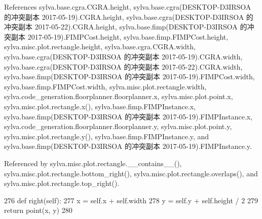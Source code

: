 References sylva.\+base.\+cgra.\+C\+G\+R\+A.\+height, sylva.\+base.\+cgra(\+D\+E\+S\+K\+T\+O\+P-\/\+D3\+I\+R\+S\+O\+A 的冲突副本 2017-\/05-\/19).\+C\+G\+R\+A.\+height, sylva.\+base.\+cgra(\+D\+E\+S\+K\+T\+O\+P-\/\+D3\+I\+R\+S\+O\+A 的冲突副本 2017-\/05-\/22).\+C\+G\+R\+A.\+height, sylva.\+base.\+fimp(\+D\+E\+S\+K\+T\+O\+P-\/\+D3\+I\+R\+S\+O\+A 的冲突副本 2017-\/05-\/19).\+F\+I\+M\+P\+Cost.\+height, sylva.\+base.\+fimp.\+F\+I\+M\+P\+Cost.\+height, sylva.\+misc.\+plot.\+rectangle.\+height, sylva.\+base.\+cgra.\+C\+G\+R\+A.\+width, sylva.\+base.\+cgra(\+D\+E\+S\+K\+T\+O\+P-\/\+D3\+I\+R\+S\+O\+A 的冲突副本 2017-\/05-\/19).\+C\+G\+R\+A.\+width, sylva.\+base.\+cgra(\+D\+E\+S\+K\+T\+O\+P-\/\+D3\+I\+R\+S\+O\+A 的冲突副本 2017-\/05-\/22).\+C\+G\+R\+A.\+width, sylva.\+base.\+fimp(\+D\+E\+S\+K\+T\+O\+P-\/\+D3\+I\+R\+S\+O\+A 的冲突副本 2017-\/05-\/19).\+F\+I\+M\+P\+Cost.\+width, sylva.\+base.\+fimp.\+F\+I\+M\+P\+Cost.\+width, sylva.\+misc.\+plot.\+rectangle.\+width, sylva.\+code\+\_\+generation.\+floorplanner.\+floorplanner.\+x, sylva.\+misc.\+plot.\+point.\+x, sylva.\+misc.\+plot.\+rectangle.\+x(), sylva.\+base.\+fimp.\+F\+I\+M\+P\+Instance.\+x, sylva.\+base.\+fimp(\+D\+E\+S\+K\+T\+O\+P-\/\+D3\+I\+R\+S\+O\+A 的冲突副本 2017-\/05-\/19).\+F\+I\+M\+P\+Instance.\+x, sylva.\+code\+\_\+generation.\+floorplanner.\+floorplanner.\+y, sylva.\+misc.\+plot.\+point.\+y, sylva.\+misc.\+plot.\+rectangle.\+y(), sylva.\+base.\+fimp.\+F\+I\+M\+P\+Instance.\+y, and sylva.\+base.\+fimp(\+D\+E\+S\+K\+T\+O\+P-\/\+D3\+I\+R\+S\+O\+A 的冲突副本 2017-\/05-\/19).\+F\+I\+M\+P\+Instance.\+y.



Referenced by sylva.\+misc.\+plot.\+rectangle.\+\_\+\+\_\+contains\+\_\+\+\_\+(), sylva.\+misc.\+plot.\+rectangle.\+bottom\+\_\+right(), sylva.\+misc.\+plot.\+rectangle.\+overlaps(), and sylva.\+misc.\+plot.\+rectangle.\+top\+\_\+right().


\begin{DoxyCode}
276         \textcolor{keyword}{def }right(self):
277             x = self.x + self.width
278             y = self.y + self.height / 2
279             \textcolor{keywordflow}{return} point(x, y)
280 
\end{DoxyCode}
\mbox{\label{classsylva_1_1misc_1_1plot_1_1rectangle_ac5b4d8952847953f5aa329fb839b63ad}} 
